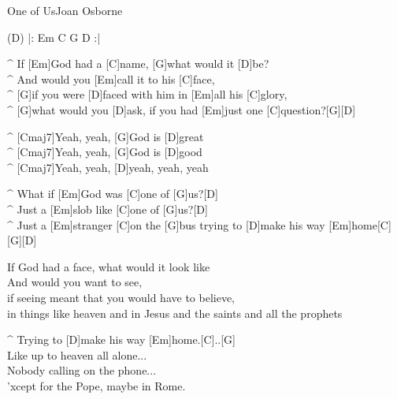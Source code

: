 \begin{song}{One of Us}{Joan Osborne}

\begin{guitar}
(D) |: Em C G D :|\\
\end{guitar}

\begin{guitar}
^ If [Em]God had a [C]name, [G]what would it [D]be?\\
^ And would you [Em]call it to his [C]face, \\
^ [G]if you were [D]faced with him in [Em]all his [C]glory,\\
^ [G]what would you [D]ask, if you had [Em]just one [C]question?[G][D]\\
\end{guitar}

\begin{guitar}
^ [Cmaj7]Yeah, yeah, [G]God is [D]great \\
^ [Cmaj7]Yeah, yeah, [G]God is [D]good\\
^ [Cmaj7]Yeah, yeah, [D]yeah, yeah, yeah\\
\end{guitar}

\begin{guitar}
^ What if [Em]God was [C]one of [G]us?[D]\\
^ Just a [Em]slob like [C]one of [G]us?[D]\\
^ Just a [Em]stranger [C]on the [G]bus trying to [D]make his way [Em]home[C][G][D]\\
\end{guitar}

\begin{guitar}
If God had a face, what would it look like \\
And would you want to see,\\
if seeing meant that you would have to believe, \\
in things like heaven and in Jesus and the saints and all the prophets\\
\end{guitar}


\begin{guitar}
^ Trying to [D]make his way [Em]home.[C]..[G]\\
Like up to heaven all alone...\\
Nobody calling on the phone...\\
'xcept for the Pope, maybe in Rome.\\
\end{guitar}


\end{song}
